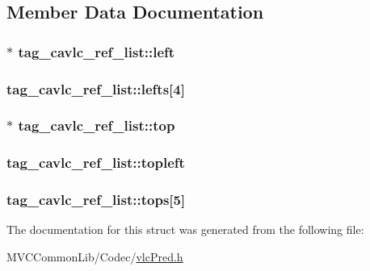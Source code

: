 \subsection{Member Data Documentation}
\hypertarget{structtag__cavlc__ref__list_a854c970004394513901757cc3dcb65e5}{
\subsubsection[{left}]{$\ast$ {\bf tag\_\-cavlc\_\-ref\_\-list::left}}}
\label{structtag__cavlc__ref__list_a854c970004394513901757cc3dcb65e5}
\hypertarget{structtag__cavlc__ref__list_ae9fad3ab9c8086e7dd826492ee027b7d}{
\subsubsection[{lefts}]{ {\bf tag\_\-cavlc\_\-ref\_\-list::lefts}\mbox{[}4\mbox{]}}}
\label{structtag__cavlc__ref__list_ae9fad3ab9c8086e7dd826492ee027b7d}
\hypertarget{structtag__cavlc__ref__list_af93b34de26224281e33b951333a665c7}{
\subsubsection[{top}]{$\ast$ {\bf tag\_\-cavlc\_\-ref\_\-list::top}}}
\label{structtag__cavlc__ref__list_af93b34de26224281e33b951333a665c7}
\hypertarget{structtag__cavlc__ref__list_ac71d66d925cb5fbc0c15812f70aa2e78}{
\subsubsection[{topleft}]{ {\bf tag\_\-cavlc\_\-ref\_\-list::topleft}}}
\label{structtag__cavlc__ref__list_ac71d66d925cb5fbc0c15812f70aa2e78}
\hypertarget{structtag__cavlc__ref__list_ab4d9282dda63bfa7f48cff76db26de04}{
\subsubsection[{tops}]{ {\bf tag\_\-cavlc\_\-ref\_\-list::tops}\mbox{[}5\mbox{]}}}
\label{structtag__cavlc__ref__list_ab4d9282dda63bfa7f48cff76db26de04}


The documentation for this struct was generated from the following file:\begin{DoxyCompactItemize}
\item 
MVCCommonLib/Codec/\hyperlink{vlc_pred_8h}{vlcPred.h}\end{DoxyCompactItemize}
